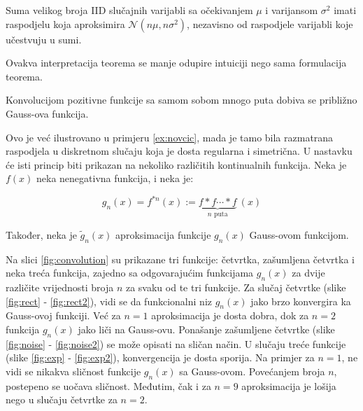 \setcounter{corollary}{0}
\begin{corollary}

  Suma velikog broja IID slučajnih varijabli sa očekivanjem $\mu$ i varijansom
  $\sigma^2$ imati raspodjelu koja aproksimira $\mathcal{N}(n\mu, n\sigma^2)$,
  nezavisno od raspodjele varijabli koje učestvuju u sumi. 

\end{corollary}

Ovakva interpretacija teorema se manje odupire intuiciji nego sama formulacija
teorema.



\begin{corollary}
  Konvolucijom pozitivne funkcije sa samom sobom mnogo puta dobiva se približno
  Gauss-ova funkcija.
\end{corollary}

Ovo je već ilustrovano u primjeru \ref{ex:novcic}, mada je tamo bila razmatrana
raspodjela u diskretnom slučaju koja je dosta regularna i simetrična. U nastavku
će isti princip biti prikazan na nekoliko različitih kontinualnih funkcija. Neka
je $f(x)$ neka nenegativna funkcija, i neka je:

\begin{equation}
  g_n(x) = f^{*n}(x) := \underbrace{f*f\cdots*f}_{n\text{ puta}}\ (x)
\end{equation}

Također, neka je $\widetilde{g}_n(x)$ aproksimacija funkcije $g_n(x)$ Gauss-ovom
funkcijom.

Na slici \ref{fig:convolution} su prikazane tri funkcije: četvrtka, zašumljena
četvrtka i neka treća funkcija, zajedno sa odgovarajućim funkcijama $g_n(x)$ za
dvije različite vrijednosti broja $n$ za svaku od te tri funkcije. Za slučaj
četvrtke (slike \ref{fig:rect} - \ref{fig:rect2}), vidi se da funkcionalni niz
$g_n(x)$ jako brzo konvergira ka Gauss-ovoj funkciji. Već za $n=1$ aproksimacija
je dosta dobra, dok za $n=2$ funkcija $g_n(x)$ jako liči na Gauss-ovu. Ponašanje
zašumljene četvrtke (slike \ref{fig:noise} - \ref{fig:noise2}) se može opisati
na sličan način. U slučaju treće funkcije (slike \ref{fig:exp} -
\ref{fig:exp2}), konvergencija je dosta sporija. Na primjer za $n=1$, ne vidi se
nikakva sličnost funkcije $g_n(x)$ sa Gauss-ovom.  Povećanjem broja $n$,
postepeno se uočava sličnost. Međutim, čak i za $n=9$ aproksimacija je lošija
nego u slučaju četvrtke za $n=2$.

